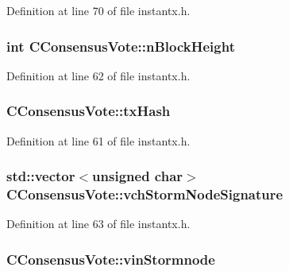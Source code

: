Definition at line 70 of file instantx.\+h.

\hypertarget{class_c_consensus_vote_a19f39b69e4adf3f9b5557d465cabc7ed}{}
\subsubsection[{n\+Block\+Height}]{\setlength{\rightskip}{0pt plus 5cm}int C\+Consensus\+Vote\+::n\+Block\+Height}\label{class_c_consensus_vote_a19f39b69e4adf3f9b5557d465cabc7ed}


Definition at line 62 of file instantx.\+h.

\hypertarget{class_c_consensus_vote_a3eca3f8fac54643f7f2ac863635491d6}{}
\subsubsection[{tx\+Hash}]{ C\+Consensus\+Vote\+::tx\+Hash}\label{class_c_consensus_vote_a3eca3f8fac54643f7f2ac863635491d6}


Definition at line 61 of file instantx.\+h.

\hypertarget{class_c_consensus_vote_aaef3986bf440b3222751f5e7483d7ae1}{}
\subsubsection[{vch\+Storm\+Node\+Signature}]{\setlength{\rightskip}{0pt plus 5cm}std\+::vector$<$unsigned char$>$ C\+Consensus\+Vote\+::vch\+Storm\+Node\+Signature}\label{class_c_consensus_vote_aaef3986bf440b3222751f5e7483d7ae1}


Definition at line 63 of file instantx.\+h.

\hypertarget{class_c_consensus_vote_ab3a273669aecfba15f77c34d33c0ca93}{}
\subsubsection[{vin\+Stormnode}]{ C\+Consensus\+Vote\+::vin\+Stormnode}\label{class_c_consensus_vote_ab3a273669aecfba15f77c34d33c0ca93}


